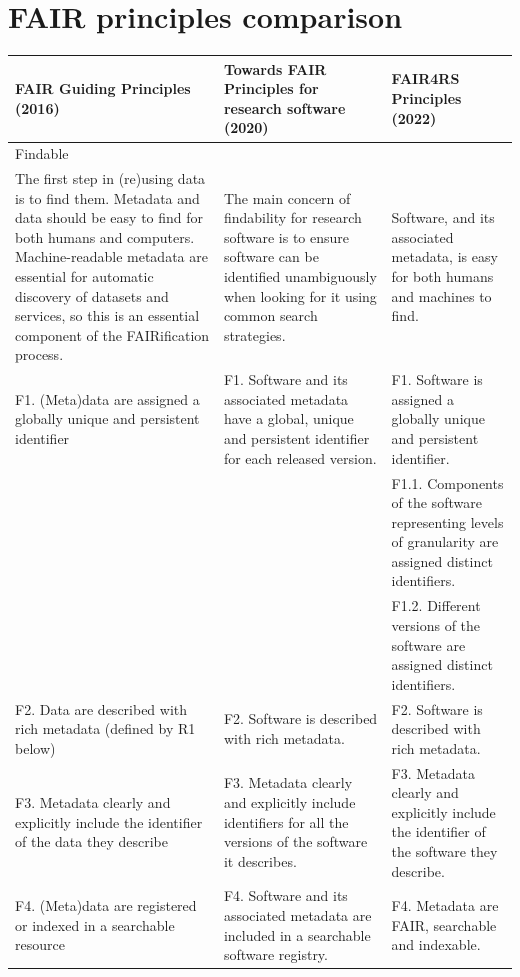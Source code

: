 \chapter{FAIR principles comparison}
\label{AppendixA}


{\setlength\LTleft{-2cm}
\setlength\LTright{-2cm}
\scriptsize
\begin{longtable}{@{\extracolsep{\fill}} p{6cm}   p{6cm}  p{6cm}}
\textbf{FAIR Guiding Principles (2016)}    & \textbf{Towards FAIR Principles for research software (2020)}            & \textbf{FAIR4RS Principles (2022)}\\
\hline
\hline
\multicolumn{2}{l}{Findable} &  \\
\hline
The first step in (re)using data is to find them. Metadata and data should be easy to find for both humans and computers. Machine-readable metadata are essential for automatic discovery of datasets and services, so this is an essential component of the FAIRification process. & The main concern of findability for research software is to ensure software can be identified unambiguously when looking for it using common search strategies. & Software, and its associated metadata, is easy for both humans and machines to find. \\
\hline
F1. (Meta)data are assigned a globally unique and persistent identifier & F1. Software and its associated metadata have a global, unique and persistent identifier for each released version. & F1. Software is assigned a globally unique and persistent identifier. \\
 &  & F1.1. Components of the software representing levels of granularity are assigned distinct identifiers. \\
 &  & F1.2. Different versions of the software are assigned distinct identifiers. \\
\hline
F2. Data are described with rich metadata (defined by R1 below) & F2. Software is described with rich metadata. & F2. Software is described with rich metadata. \\
\hline
F3. Metadata clearly and explicitly include the identifier of the data they describe & F3. Metadata clearly and explicitly include identifiers for all the versions of the software it describes. & F3. Metadata clearly and explicitly include the identifier of the software they describe. \\
\hline
F4. (Meta)data are registered or indexed in a searchable resource & F4. Software and its associated metadata are included in a searchable software registry. & F4. Metadata are FAIR, searchable and indexable. \\

\end{longtable}}
